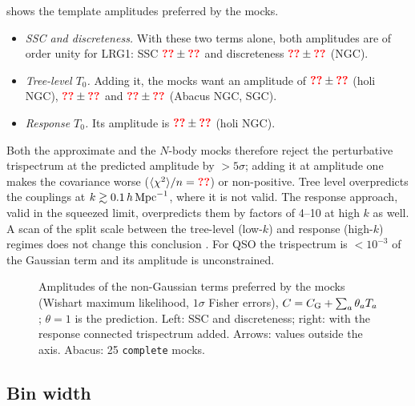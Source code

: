  shows the template amplitudes preferred by the mocks.
\begin{itemize}
\item \emph{SSC and discreteness.} With these two terms alone, both amplitudes are of order unity for LRG1: SSC $\val{tpl/holi_LRG1_NGC/base/ssc}\pm\val{tplerr/holi_LRG1_NGC/base/ssc}$ and discreteness $\val{tpl/holi_LRG1_NGC/base/disc}\pm\val{tplerr/holi_LRG1_NGC/base/disc}$ (NGC).
\item \emph{Tree-level $T_0$.} Adding it, the mocks want an amplitude of $\val{tpl/holi_LRG1_NGC/tree/T0_tree}\pm\val{tplerr/holi_LRG1_NGC/tree/T0_tree}$ (holi NGC), $\val{tpl/Abacus_LRG1_NGC/tree/T0_tree}\pm\val{tplerr/Abacus_LRG1_NGC/tree/T0_tree}$ and $\val{tpl/Abacus_LRG1_SGC/tree/T0_tree}\pm\val{tplerr/Abacus_LRG1_SGC/tree/T0_tree}$ (Abacus NGC, SGC).
\item \emph{Response $T_0$.} Its amplitude is $\val{tpl/holi_LRG1_NGC/resp/T0_response}\pm\val{tplerr/holi_LRG1_NGC/resp/T0_response}$ (holi NGC).
\end{itemize}
Both the approximate and the $N$-body mocks therefore reject the perturbative trispectrum at the predicted amplitude by $>5\sigma$; adding it at amplitude one makes the covariance worse ($\langle\chi^2\rangle/n=\val{trace/LRG1/NGC/rec+T0tree/0.3}$) or non-positive. Tree level overpredicts the couplings at $k\gtrsim0.1\,h\,\mathrm{Mpc}^{-1}$, where it is not valid. The response approach, valid in the squeezed limit, overpredicts them by factors of 4--10 at high $k$ as well. A scan of the split scale between the tree-level (low-$k$) and response (high-$k$) regimes does not change this conclusion . For QSO the trispectrum is $<10^{-3}$ of the Gaussian term and its amplitude is unconstrained.

\begin{figure}
  \centering{}
  \caption{Amplitudes of the non-Gaussian terms preferred by the mocks (Wishart maximum likelihood, $1\sigma$ Fisher errors), $C=C_{\rm G}+\sum_a\theta_aT_a$; $\theta=1$ is the prediction. Left: SSC and discreteness; right: with the response connected trispectrum added. Arrows: values outside the axis. Abacus: 25 \texttt{complete} mocks.}
  \label{fig:templates}
\end{figure}

\subsection{Bin width}
\label{sec:binwidth}

